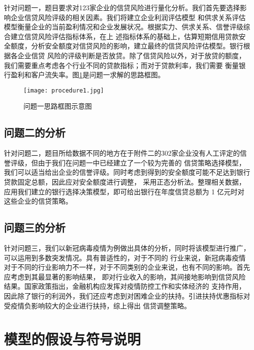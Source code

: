 \documentclass[withoutpreface,bwprint]{cumcmthesis}
\begin{document}
针对问题一，题目要求对123家企业的信贷风险进行量化分析。我们首先要选择影响企业信贷风险评级的相关因素。我们将建立企业利润评估模型
和供求关系评估模型衡量企业的当前盈利情况和企业发展状况。根据实力、供求关系、信誉评级综合建立信贷风险评估指标体系，在上
述指标体系的基础上，估算短期信用贷款安全额度，分析安全额度对信贷风险的影响，建立最终的信贷风险评估模型。银行根据各企业信贷
风险的评级判断是否放贷。除了信贷风险以外，对于放贷的额度，我们需要重点考虑各个行业不同的贷款指标；而对于贷款利率，我们需要
衡量银行盈利和客户流失率。图\ref{fig:procedure1}是问题一求解的思路框图。

\begin{figure}[H]
    \centering
    \texttt{[image: procedure1.jpg]}
    \caption{问题一思路框图示意图}
    \label{fig:procedure1}
\end{figure}

\subsection{问题二的分析}
针对问题二，题目所给数据不同的地方在于附件二的302家企业没有人工评定的信誉评级，但由于我们在问题一中已经建立了一个较为完善的
信贷策略选择模型，我们可以适当给出企业的信誉评级。同时考虑到得到的安全额度可能不足达到银行贷款固定总额，因此应对安全额度进行调整，
采用正态分析法。整理相关数据，应用我们建立的银行选择决策模型，即可给出银行在年度信贷总额为 1 亿元时对这些企业的信贷策略。

\subsection{问题三的分析}
针对问题三，我们以新冠病毒疫情为例做出具体的分析，同时将该模型进行推广，可以运用到多数突发情况。具有普适性的，对于不同的
行业来说，新冠病毒疫情对于不同的行业影响力不一样，对于不同类别的企业来说，也有不同的影响。首先应考虑到其最显著的影响结果，
即对行业收入的影响，其间接地影响到信贷风险结果。国家政策\cite{liuqi2020}指出，金融机构应发挥对疫情防控工作和实体经济的
支持作用，因此除了银行的利润外，我们还应考虑到对困难企业的扶持。引进扶持优惠指标对受疫情负影响较大的企业进行扶持，综上得出
信贷调整策略。

\section{模型的假设与符号说明}
\end{document}
